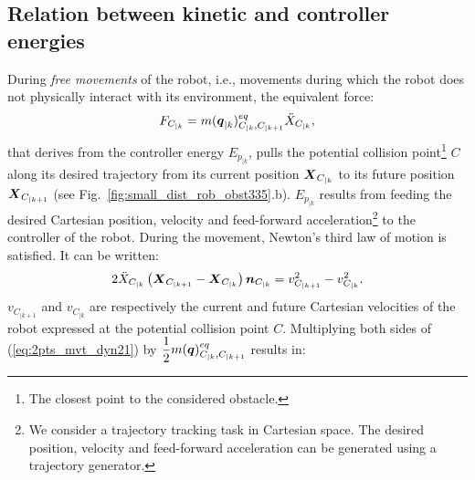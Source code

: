 \documentclass[letterpaper, 10 pt, conference]{ieeeconf}      %
\newcommand{\vect}[1]{\mbox{\boldmath${#1}$}}%
\begin{document}
\subsection{Relation between kinetic and controller energies}
\label{subsec:relEcEp}
During \textit{free movements} of the robot, i.e., movements during which the robot does not physically interact with its environment, the equivalent force: 
\begin{equation}
F_{C_{|k}} = m(\vect{q}_{|k})_{C_{|k},C_{|k+1}}^{eq} \ddot{X}_{C_{|k}},
\label{eq:pulling_force}
\end{equation}
that derives from the controller energy $E_{p_{|k}}$, pulls the potential collision point\footnote{The closest point to the considered obstacle.} $C$ along its desired trajectory from its current position $\vect{X}_{C_{|k}}$ to its future position $\vect{X}_{C_{|k+1}}$ (see Fig.~\ref{fig:small_dist_rob_obst335}.b). $E_{p_{|k}}$ results from feeding the 
desired Cartesian position, velocity and feed-forward acceleration\footnote{We consider a trajectory tracking task in Cartesian space. The desired position, velocity and feed-forward acceleration can be generated using a trajectory generator.} to the controller of the robot. During the movement, Newton's third law of motion is satisfied. It can be written:
\begin{equation}
2 \ddot{X}_{C_{|k}} \left(\vect{X}_{C_{|k+1}} - \vect{X}_{C_{|k}}\right) \vect{n}_{C_{|k}} = v_{C_{|k+1}}^2 - v_{C_{|k}}^2.
\label{eq:2pts_mvt_dyn21}
\end{equation}
$v_{C_{|k+1}}$ and $v_{C_{|k}}$ are respectively the current and future Cartesian velocities of the robot expressed at the potential collision point $C$. Multiplying both sides of (\ref{eq:2pts_mvt_dyn21}) by $\dfrac{1}{2} m(\vect{q})_{C_{|k},C_{|k+1}}^{eq}$ results in: 
\end{document}
